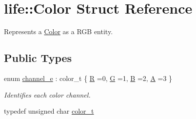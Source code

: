 \hypertarget{structlife_1_1_color}{}\section{life\+::Color Struct Reference}
\label{structlife_1_1_color}


Represents a \mbox{\hyperlink{structlife_1_1_color}{Color}} as a R\+GB entity.  


\subsection*{Public Types}
\begin{DoxyCompactItemize}
\item 
enum \mbox{\hyperlink{structlife_1_1_color_a56dfdd352118c14f349c4372fd88b251}{channel\+\_\+e}} \+: color\+\_\+t \{ \mbox{\hyperlink{structlife_1_1_color_a56dfdd352118c14f349c4372fd88b251a2f9a624ff5fcc33b32f5b052ec6bd8fa}{R}} =0, 
\mbox{\hyperlink{structlife_1_1_color_a56dfdd352118c14f349c4372fd88b251a8f6ff03cddf2c906ead096a35e8f4b99}{G}} =1, 
\mbox{\hyperlink{structlife_1_1_color_a56dfdd352118c14f349c4372fd88b251a237cdb09f2b260974329d5c673595657}{B}} =2, 
\mbox{\hyperlink{structlife_1_1_color_a56dfdd352118c14f349c4372fd88b251a91e8983ec3e57c774b40a275425e1d86}{A}} =3
 \}
\begin{DoxyCompactList}\small\item\em Identifies each color channel. \end{DoxyCompactList}\item 
typedef unsigned char \mbox{\hyperlink{structlife_1_1_color_ab392ce7ebd8204f1447c7e296dde9a17}{color\+\_\+t}}
\end{DoxyCompactItemize}
